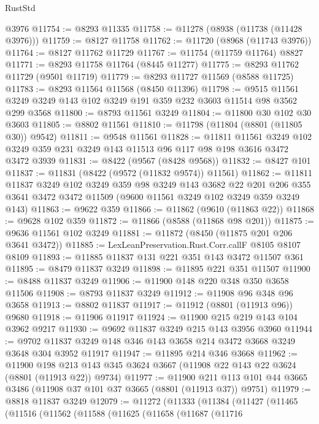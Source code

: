 \begin{lexlean}{RustStd}
\begin{coremodule}
    @3976
@11754 := @8293 @11335
@11758 := @11278 (@8938 (@11738 (@11428 @3976)))
@11759 := @8127 @11758
@11762 := @11720 (@8968 (@11743 @3976))
@11764 := @8127 @11762 @11729
@11767 := @11754 (@11759 @11764) @8827
@11771 := @8293 @11758 @11764 (@8445 @11277)
@11775 := @8293 @11762 @11729 (@9501 @11719)
@11779 := @8293 @11727 @11569 (@8588 @11725)
@11783 := @8293 @11564 @11568 (@8450 @11396)
@11798 := @9515 @11561 @3249 @3249 @143 @102 @3249 @191 @359 @232 @3603 @11514 @98 @3562 @299 @3568
@11800 := @8793 @11561 @3249
@11804 := @11800 @30 @102 @30 @3603
@11805 := @8802 @11561
@11810 := @11798 (@11804 (@8801 (@11805 @30)) @9542)
@11811 := @9548 @11561
@11828 := @11811
    @11561
    @3249
    @102
    @3249
    @359
    @231
    @3249
    @143
    @11513
    @96
    @117
    @98
    @198
    @3616
    @3472
    @3472
    @3939
@11831 := @8422 (@9567 (@8428 @9568))
@11832 := @8427 @101
@11837 := @11831 (@8422 (@9572 (@11832 @9574)) @11561)
@11862 := @11811
    @11837
    @3249
    @102
    @3249
    @359
    @98
    @3249
    @143
    @3682
    @22
    @201
    @206
    @355
    @3641
    @3472
    @3472
    @11509
    (@9600 @11561 @3249 @102 @3249 @359 @3249 @143)
@11863 := @9622 @359
@11866 := @11862 (@9610 (@11863 @22))
@11868 := @9628 @102 @359
@11872 := @11866 (@8588 (@11868 @98 @201))
@11875 := @9636 @11561 @102 @3249
@11881 := @11872 (@8450 (@11875 @201 @206 @3641 @3472))
@11885 := LexLeanPreservation.Rust.Corr.callF @8105 @8107 @8109
@11893 := @11885 @11837 @131 @221 @351 @143 @3472 @11507 @361
@11895 := @8479 @11837 @3249
@11898 := @11895 @221 @351 @11507
@11900 := @8488 @11837 @3249
@11906 := @11900 @148 @220 @348 @350 @3658 @11506
@11908 := @8793 @11837 @3249
@11912 := @11908 @96 @348 @96 @3658
@11913 := @8802 @11837
@11917 := @11912 (@8801 (@11913 @96)) @9680
@11918 := @11906 @11917
@11924 := @11900 @215 @219 @143 @104 @3962 @9217
@11930 := @9692 @11837 @3249 @215 @143 @3956 @3960
@11944 := @9702 @11837 @3249 @148 @346 @143 @3658 @214 @3472 @3668 @3249 @3648 @304 @3952 @11917
@11947 := @11895 @214 @346 @3668
@11962 := @11900
    @198
    @213
    @143
    @345
    @3624
    @3667
    (@11908 @22 @143 @22 @3624 (@8801 (@11913 @22)) @9734)
@11977 := @11900
    @211
    @113
    @101
    @44
    @3665
    @3486
    (@11908 @37 @101 @37 @3665 (@8801 (@11913 @37)) @9751)
@11979 := @8818 @11837 @3249
@12079 := @11272
    (@11333
      (@11384
        (@11427
          (@11465
            (@11516
              (@11562
                (@11588
                  (@11625
                    (@11658
                      (@11687
                        (@11716

\end{coremodule}
\end{lexlean}
